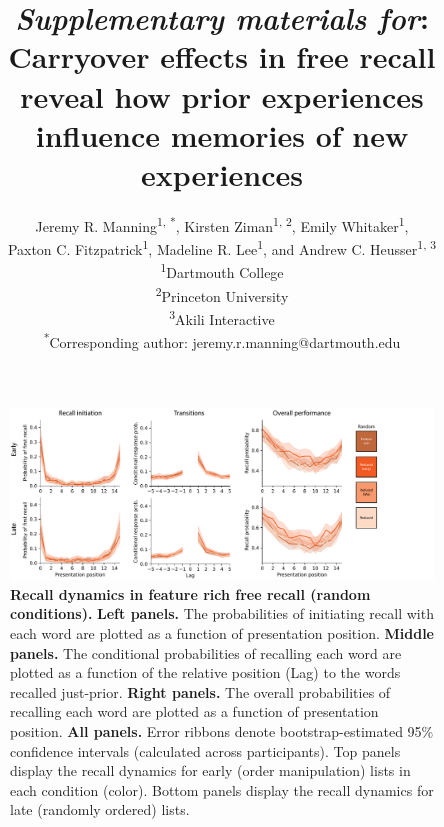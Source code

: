 \documentclass{article}
\title{\textit{Supplementary materials for}: Carryover effects in free recall reveal how prior experiences influence memories of new experiences}
\author{Jeremy R. Manning\textsuperscript{1, *}, Kirsten Ziman\textsuperscript{1, 2}, Emily Whitaker\textsuperscript{1},\\Paxton C. Fitzpatrick\textsuperscript{1}, Madeline R. Lee\textsuperscript{1}, and Andrew C. Heusser\textsuperscript{1, 3}\\\textsuperscript{1}Dartmouth College\\\textsuperscript{2}Princeton University\\\textsuperscript{3}Akili Interactive\\\textsuperscript{*}Corresponding author: jeremy.r.manning@dartmouth.edu}
\date{}
\begin{document}
\renewcommand{\figurename}{Supplementary Figure}


\setcounter{equation}{0}
\setcounter{figure}{0}
\setcounter{table}{0}
\setcounter{page}{1}
\setcounter{section}{0}
\makeatletter
\renewcommand{\theequation}{S\arabic{equation}}
\renewcommand{\thefigure}{S\arabic{figure}}
\renewcommand{\bibnumfmt}[1]{[S#1]}
\renewcommand{\citenumfont}[1]{S#1}

\maketitle

\begin{figure}[p] \centering
\includegraphics[width=\textwidth]{figures/recall_dynamics_random}

\caption{\textbf{Recall dynamics in feature rich free recall (random conditions).} \textbf{Left panels.} The probabilities of
initiating recall with each word are plotted as a function of presentation
position. \textbf{Middle panels.} The conditional probabilities of recalling
each word are plotted as a function of the relative position (Lag) to the words
recalled just-prior. \textbf{Right panels.} The overall probabilities of
recalling each word are plotted as a function of presentation position.
\textbf{All panels.} Error ribbons denote bootstrap-estimated 95\% confidence
intervals (calculated across participants). Top panels display the recall
dynamics for early (order manipulation) lists in each condition (color). Bottom
panels display the recall dynamics for late (randomly ordered) lists.}

    \label{fig:recall-dynamics-random}
\end{figure}
\end{document}
